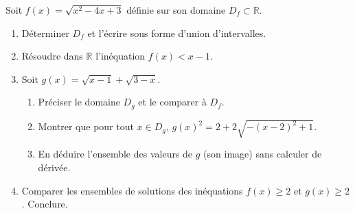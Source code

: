 \documentclass[11pt]{article}
\begin{document}
\begin{exercice}
Soit $f(x) = \sqrt{x^2 - 4x + 3}$ définie sur son domaine $D_f \subset \mathbb{R}$.
\begin{enumerate}
    \item Déterminer $D_f$ et l'écrire sous forme d'union d'intervalles.
    \item Résoudre dans $\mathbb{R}$ l'inéquation $f(x) < x - 1$.
    \item Soit $g(x) = \sqrt{x-1} + \sqrt{3-x}$.
    \begin{enumerate}
        \item Préciser le domaine $D_g$ et le comparer à $D_f$.
        \item Montrer que pour tout $x \in D_g$, $g(x)^2 = 2 + 2\sqrt{-(x-2)^2 + 1}$.
        \item En déduire l'ensemble des valeurs de $g$ (son image) sans calculer de dérivée.
    \end{enumerate}
    \item Comparer les ensembles de solutions des inéquations $f(x) \geq 2$ et $g(x) \geq 2$. Conclure.
\end{enumerate}
\end{exercice}
\end{document}
